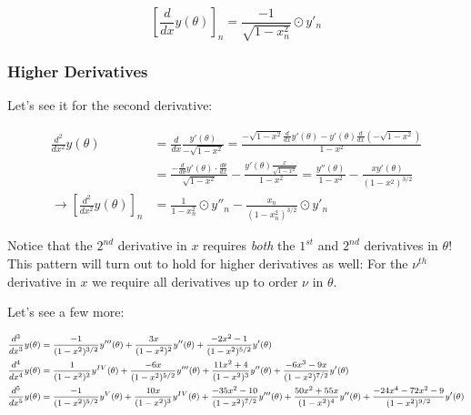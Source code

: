 \documentclass[10pt]{article}
\begin{document}
$$[\frac{d}{dx} y(\theta)]_n = \frac{-1}{\sqrt{1 - x_n^2}} \odot y'_n$$

\subsubsection{Higher Derivatives}

Let's see it for the second derivative:

\begin{equation}\label{2nd}
\begin{aligned}
\frac{d^2}{dx^2} y(\theta) &= \frac{d}{dx} \frac{y'(\theta)}{-\sqrt{1-x^2}} = \frac{-\sqrt{1-x^2} \frac{d}{dx} y'(\theta) - y'(\theta) \frac{d}{dx} (-\sqrt{1-x^2})}{1 - x^2} \\
&= \frac{-\frac{d}{d\theta}y'(\theta)\cdot \frac{d\theta}{dx}}{\sqrt{1-x^2}} - \frac{y'(\theta)\frac{x}{\sqrt{1-x^2}}}{1 - x^2} = \frac{y''(\theta)}{1-x^2} - \frac{x y'(\theta)}{(1 - x^2)^{3/2}} \\
\longrightarrow [\frac{d^2}{dx^2} y(\theta)]_n &= \frac{1}{1-x_n^2} \odot y''_n - \frac{x_n}{(1 - x_n^2)^{3/2}} \odot y'_n
\end{aligned}
\end{equation}

Notice that the $2^{nd}$ derivative in $x$ requires \textit{both} the $1^{st}$ and $2^{nd}$ derivatives in $\theta$! This pattern will turn out to hold for higher derivatives as well: For the $\nu^{th}$ derivative in $x$ we require all derivatives up to order $\nu$ in $\theta$.

Let's see a few more:

\begin{equation}\label{derivatives}
\footnotesize
\begin{aligned}
\frac{d^3}{dx^3} y(\theta) &= \frac{-1}{(1-x^2)^{3/2}} y'''(\theta) + \frac{3x}{(1-x^2)^2} y''(\theta) + \frac{-2x^2 - 1}{(1-x^2)^{5/2}} y'(\theta)\\
\frac{d^4}{dx^4} y(\theta) &= \frac{1}{(1-x^2)^2} y^{IV}(\theta) + \frac{-6x}{(1-x^2)^{5/2}} y'''(\theta) + \frac{11x^2 + 4}{(1-x^2)^3} y''(\theta) + \frac{-6x^3 - 9x}{(1-x^2)^{7/2}} y'(\theta)\\
\frac{d^5}{dx^5} y(\theta) &= \frac{-1}{(1-x^2)^{5/2}} y^V(\theta) + \frac{10x}{(1-x^2)^3} y^{IV}(\theta) + \frac{-35x^2-10}{(1-x^2)^{7/2}} y'''(\theta) + \frac{50x^2 + 55x}{(1-x^2)^4} y''(\theta) + \frac{-24x^4 -72x^2 - 9}{(1-x^2)^{9/2}} y'(\theta)\\
\end{aligned}
\normalsize
\end{equation}\vspace{2mm}
\end{document}
